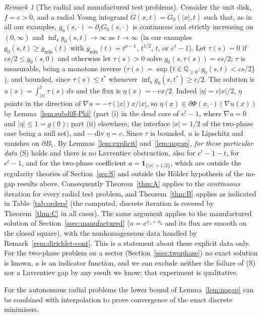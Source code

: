 \documentclass[11pt]{amsart}
\theoremstyle{definition}
\theoremstyle{remark}
\newtheorem{remark}[theorem]{Remark}
\numberwithin{equation}{section}
\newcommand{\Q}{\mathbb{Q}}
\newcommand{\abs}[1]{\lvert #1\rvert}
\DeclareMathOperator{\divg}{div}
\begin{document}
\begin{remark}[The radial and manufactured test problems]\label{rem:radial-S}
Consider the unit disk, $f=c>0$, and a radial Young integrand $G(x,t)=G_0(\abs x,t)$ such that, as in all our examples, $g_0(s,\cdot)=\partial_tG_0(s,\cdot)$ is continuous and strictly increasing on $(0,\infty)$ and $\inf_sg_0(s,t)\to\infty$ as $t\to\infty$ (in our examples $g_0(s,t)\ge g_{\min}(t)$ with $g_{\min}(t)=t^{p-1}$, $t^{1/2}$, $t$, or $e^t-1$). Let $\tau(s)=0$ if $cs/2\le g_0(s,0)$ and otherwise let $\tau(s)>0$ solve $g_0(s,\tau(s))=cs/2$; $\tau$ is measurable, being a monotone inverse ($\tau(s)=\sup\{t\in\Q_{\ge0}:g_0(s,t)<cs/2\}$), and bounded, since $\tau(s)\le t^*$ whenever $\inf_sg_0(s,t^*)\ge c/2$. The solution is $u(x)=\int_{\abs x}^1\tau(s)\,ds$ and the flux is $\eta(x)=-cx/2$. Indeed $\abs\eta=c\abs x/2$, $\eta$ points in the direction of $\nabla u=-\tau(\abs x)x/\abs x$, so $\eta(x)\in\partial\Phi(x,\cdot)(\nabla u(x))$ by Lemma~\ref{lem:subdiff-Phi} (part (i) in the dead core of $e^t-1$, where $\nabla u=0$ and $\abs\eta\le1=g(0)$; part (ii) elsewhere, the interface $\abs x=1/2$ of the two-phase case being a null set), and $-\divg\eta=c$. Since $\tau$ is bounded, $u$ is Lipschitz and vanishes on $\partial B_1$. By Lemmas~\ref{lem:explicit} and~\ref{lem:nogap}, \emph{for these particular data} (S) holds and there is no Lavrentiev obstruction, also for $e^t-1-t$, for $e^t-1$, and for the two-phase coefficient $a=\mathbf 1_{\{\abs x>1/2\}}$, which are outside the regularity theories of Section~\ref{sec:S} and outside the H\"older hypothesis of the no-gap results above. Consequently Theorem~\ref{thm:A} applies to the \emph{continuous} iteration for every radial test problem, and Theorem~\ref{thm:B} applies as indicated in Table~\ref{tab:orders} (the computed, discrete iteration is covered by Theorem~\ref{thm:C} in all cases). The same argument applies to the manufactured solution of Section~\ref{ssec:manufactured} ($u=e^{x_1+x_2}$ and its flux are smooth on the closed square), with the nonhomogeneous data handled by Remark~\ref{rem:dirichlet-cont}. This is a statement about these explicit data only. For the two-phase problem on a sector (Section~\ref{ssec:twophase}) no exact solution is known, $a$ is an indicator function, and we can exclude neither the failure of (S) nor a Lavrentiev gap by any result we know; that experiment is qualitative.
\end{remark}

For the autonomous radial problems the lower bound of Lemma~\ref{lem:nogap} can be combined with interpolation to prove convergence of the exact discrete minimisers.
\end{document}
